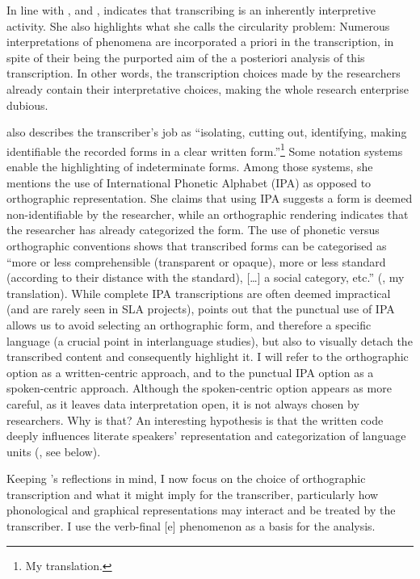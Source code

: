 \documentclass[output=paper,colorlinks,citecolor=brown,modfonts,nonflat]{../langscibook}
\begin{document}
In line with \citet{Ochs1979}, \cite {Jefferson1996} and \citet{Saturno2015}, \citet{Mondada2000} indicates that transcribing is an inherently interpretive activity. She also highlights what she calls the circularity problem: Numerous interpretations of phenomena are incorporated a priori in the transcription, in spite of their being the purported aim of the a posteriori analysis of this transcription. In other words, the transcription choices made by the researchers already contain their interpretative choices, making the whole research enterprise dubious.

\citet[8]{Mondada2000} also describes the transcriber’s job as “isolating, cutting out, identifying, making identifiable the recorded forms in a clear written form.”\footnote{{My translation.}} Some notation systems enable the highlighting of indeterminate forms. Among those systems, she mentions the use of International Phonetic Alphabet (IPA) as opposed to orthographic representation. She claims that using IPA suggests a form is deemed non-identifiable by the researcher, while an orthographic rendering indicates that the researcher has already categorized the form. The use of phonetic versus orthographic conventions shows that transcribed forms can be categorised as “more or less comprehensible (transparent or opaque), more or less standard (according to their distance with the standard), […] a social category, etc.” (\citealt[8]{Mondada2000}, my translation). While complete IPA transcriptions are often deemed impractical (and are rarely seen in SLA projects), \citeauthor{Mondada2000} points out that the punctual use of IPA allows us to avoid selecting an orthographic form, and therefore a specific language (a crucial point in interlanguage studies), but also to visually detach the transcribed content and consequently highlight it. I will refer to the orthographic option as a written-centric approach, and to the punctual IPA option as a spoken-centric approach. Although the spoken-centric option appears as more careful, as it leaves data interpretation open, it is not always chosen by researchers. Why is that? An interesting hypothesis is that the written code deeply influences literate speakers’ representation and categorization of language units (\citealt{Jaffré2006}, see below).

Keeping \citeauthor{Mondada2000}’s reflections in mind, I now focus on the choice of orthographic transcription and what it might imply for the transcriber, particularly how phonological and graphical representations may interact and be treated by the transcriber. I use the verb-final [e] phenomenon as a basis for the analysis.
\end{document}
